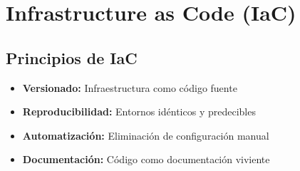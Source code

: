 \documentclass[12pt,a4paper]{article}
\begin{document}
\section{Infrastructure as Code (IaC)}

\subsection{Principios de IaC}
\begin{itemize}
    \item \textbf{Versionado:} Infraestructura como código fuente
    \item \textbf{Reproducibilidad:} Entornos idénticos y predecibles
    \item \textbf{Automatización:} Eliminación de configuración manual
    \item \textbf{Documentación:} Código como documentación viviente
\end{itemize}
\end{document}
